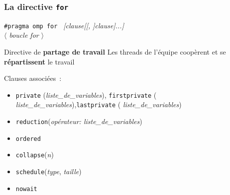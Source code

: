 \documentclass{beamer}
\begin{document}
\begin{frame}
  \frametitle{La directive  {\tt for}}
  
\begin{framed}
  {\tt \#pragma omp for } {\it  [clause[[, ]clause]...]}  \\
  {\it $\langle$ boucle for $\rangle$} 
\end{framed}

\begin{alertblock}{Directive de \textbf{partage de travail}}
  Les threads de l'équipe coopèrent et se \textbf{répartissent} le travail
\end{alertblock}

\medskip
  
Clauses associées~:
  
  \begin{itemize}
  \item  {\tt private} ({\it liste\_de\_variables}), {\tt firstprivate} ({\it
      liste\_de\_variables}),{\tt lastprivate} ({\it
      liste\_de\_variables})
  \item {\tt reduction}({\it opérateur: liste\_de\_variables})
  \item {\tt ordered}
  \item {\tt collapse}({\it n})
  \item {\tt  schedule}({\it type}, {\it taille})
  \item {\tt nowait}
  \end{itemize}
  
\end{frame}
\end{document}

